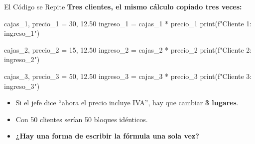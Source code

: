\documentclass[aspectratio=169, 11pt]{beamer}
\begin{document}
\begin{frame}[fragile,shrink=28]{El Código se Repite}
  \vspace{-6pt}
  {\footnotesize\color{arcaDark}\bfseries
    Tres clientes, el mismo cálculo copiado tres veces:}

  \vspace{2pt}
  \begin{pyblock}
cajas_1, precio_1 = 30, 12.50
ingreso_1 = cajas_1 * precio_1
print(f"Cliente 1: {ingreso_1}")

cajas_2, precio_2 = 15, 12.50
ingreso_2 = cajas_2 * precio_2
print(f"Cliente 2: {ingreso_2}")

cajas_3, precio_3 = 50, 12.50
ingreso_3 = cajas_3 * precio_3
print(f"Cliente 3: {ingreso_3}")
  \end{pyblock}

  \vspace{2pt}
  {\scriptsize\color{textMuted}
  \begin{itemize}\setlength{\itemsep}{2pt}
    \item[{\color{codeOrange}\scriptsize\faExclamationTriangle}]
      Si el jefe dice ``ahora el precio incluye IVA'',
      hay que cambiar \textbf{3 lugares}.
    \item[{\color{codeOrange}\scriptsize\faExclamationTriangle}]
      Con 50 clientes serían 50 bloques idénticos.
    \item[{\color{arcaRed}\scriptsize\faBolt}]
      \textbf{¿Hay una forma de escribir la fórmula una sola vez?}
  \end{itemize}
  }
\end{frame}
\end{document}

